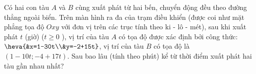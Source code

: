 \begin{bt}%
	Có hai con tàu $A$ và $B$ cùng xuất phát từ hai bến, chuyển động đều theo đường thẳng ngoài biển. Trên màn hình ra đa của trạm điều khiển (được coi như mặt phẳng tọa độ $Oxy$  với đơn vị trên các trục tính theo ki - lô - mét), sau khi xuất phát $t$ (giờ) ($t\ge0$ ), vị trí của tàu $A$ có tọa độ được xác định bởi công thức: $\heva{&x=1-30t\\&y=-2+15t}$, vị trí của tàu $B$ có tọa độ là $\left(1-10t; -4+17t\right)$. Sau bao lâu (tính theo phút) kể từ thời điểm xuất phát hai tàu gần nhau nhất?
\end{bt}

